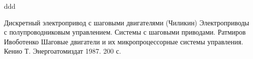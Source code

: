 ddd
\begin{thebibliography}{20}
 Дискретный электропривод с шаговыми двигателями (Чиликин)
 Электроприводы с полупроводниковым управлением. Системы с шаговыми
приводами. Ратмиров Ивоботенко
 Шаговые двигатели и их микропроцессорные системы управления. Кенио Т.
Энергоатомиздат 1987. 200 с.
\end{thebibliography}
